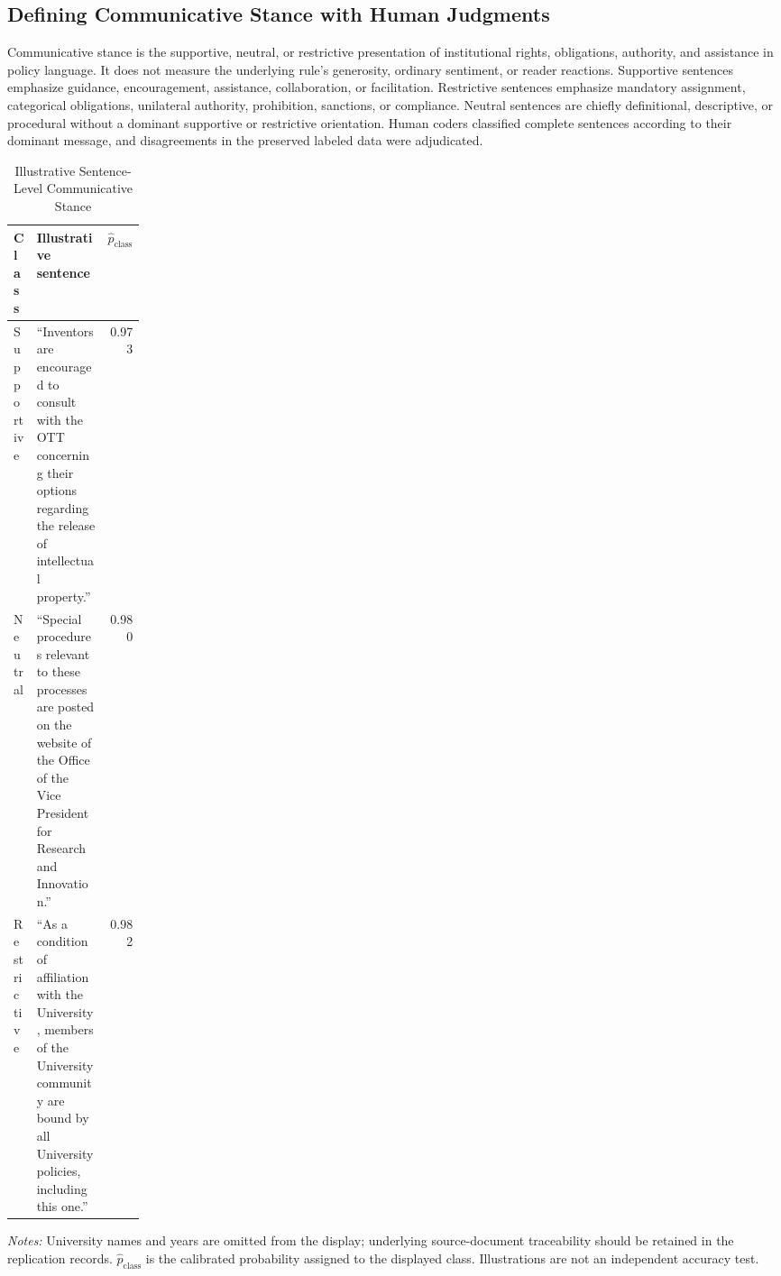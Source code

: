 \documentclass[11pt]{article}
\begin{document}
\subsection{Defining Communicative Stance with Human Judgments}
Communicative stance is the supportive, neutral, or restrictive presentation of institutional rights, obligations, authority, and assistance in policy language. It does not measure the underlying rule's generosity, ordinary sentiment, or reader reactions. Supportive sentences emphasize guidance, encouragement, assistance, collaboration, or facilitation. Restrictive sentences emphasize mandatory assignment, categorical obligations, unilateral authority, prohibition, sanctions, or compliance. Neutral sentences are chiefly definitional, descriptive, or procedural without a dominant supportive or restrictive orientation. Human coders classified complete sentences according to their dominant message, and disagreements in the preserved labeled data were adjudicated.

\begin{table}[htbp]\centering\caption{Illustrative Sentence-Level Communicative Stance}\label{tab:examples}
\begin{threeparttable}\small
\begin{tabularx}{\linewidth}{@{}p{0.17\linewidth}Xr@{}}\toprule Class&Illustrative sentence&$\hat p_{\mathrm{class}}$\\\midrule
Supportive&``Inventors are encouraged to consult with the OTT concerning their options regarding the release of intellectual property.''&0.973\\\addlinespace
Neutral&``Special procedures relevant to these processes are posted on the website of the Office of the Vice President for Research and Innovation.''&0.980\\\addlinespace
Restrictive&``As a condition of affiliation with the University, members of the University community are bound by all University policies, including this one.''&0.982\\\bottomrule
\end{tabularx}
\begin{tablenotes}[flushleft]\footnotesize\item\emph{Notes:} University names and years are omitted from the display; underlying source-document traceability should be retained in the replication records. $\hat p_{\mathrm{class}}$ is the calibrated probability assigned to the displayed class. Illustrations are not an independent accuracy test.\end{tablenotes}
\end{threeparttable}\end{table}
\end{document}
